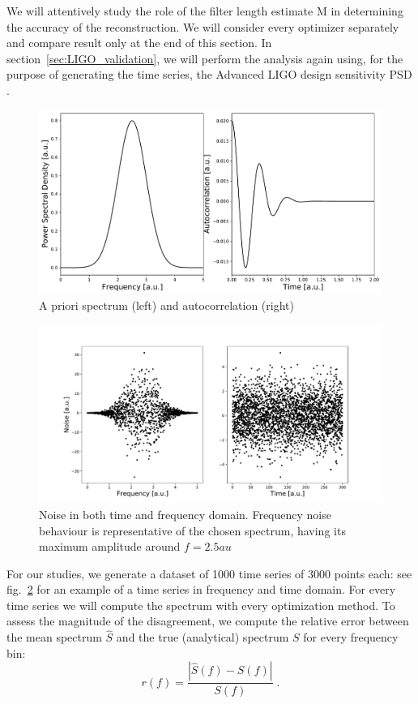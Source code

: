 \documentclass[twocolumn,showpacs,preprintnumbers,nofootinbib,prd,
superscriptaddress,10pt]{revtex4-1}
\begin{document}
We will attentively study the role of the filter length estimate M in determining the accuracy of the reconstruction. We will consider every optimizer separately and compare result only at the end of this section.
In section~\ref{sec:LIGO_validation}, we will perform the analysis again using, for the purpose of generating the time series, the Advanced LIGO design sensitivity PSD \cite{Ligo}.

\begin{figure}
	\centering
	\includegraphics[width = \linewidth]{Images/Noise and PSD/NormalPSDautocorr.pdf}
	\caption{A priori spectrum (left) and autocorrelation (right)}
	\label{fig:autocorr}
\end{figure}

\begin{figure}
    \centering
        \includegraphics[width = \linewidth]{Images/NormalPSD/NormalNoise.pdf}
    \caption{Noise in both time and frequency domain. Frequency noise behaviour is representative of the chosen spectrum, having its maximum amplitude around $f = 2.5 au$}
    \label{fig:noise}
\end{figure}

For our studies, we generate a dataset of 1000 time series of 3000 points each: see fig.~\ref{fig:noise} for an example of a time series in frequency and time domain.
For every time series we will compute the spectrum with every optimization method.
To assess the magnitude of the disagreement, we compute the relative error between the mean spectrum $\hat{S}$ and the true (analytical) spectrum $S$ for every frequency bin:
\begin{equation}
r(f) = \frac{|\hat{S}(f) - S(f)|}{S(f)}\; .
\end{equation}
\end{document}

